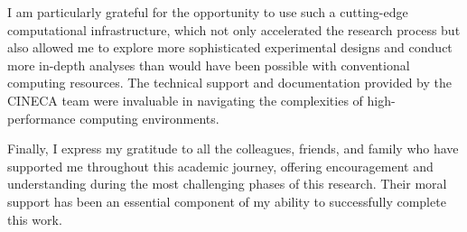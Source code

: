 \documentclass[12pt,a4paper]{article}
\begin{document}
I am particularly grateful for the opportunity to use such a cutting-edge computational infrastructure, which not only accelerated the research process but also allowed me to explore more sophisticated experimental designs and conduct more in-depth analyses than would have been possible with conventional computing resources. The technical support and documentation provided by the CINECA team were invaluable in navigating the complexities of high-performance computing environments.

Finally, I express my gratitude to all the colleagues, friends, and family who have supported me throughout this academic journey, offering encouragement and understanding during the most challenging phases of this research. Their moral support has been an essential component of my ability to successfully complete this work.



\end{document}
